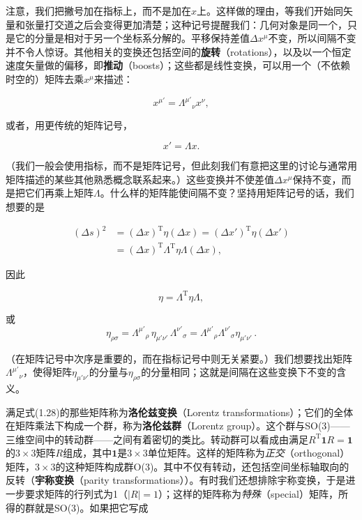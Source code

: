 注意，我们把撇号加在指标上，而不是加在$x$上。这样做的理由，等我们开始同矢量和张量打交道之后会变得更加清楚；这种记号提醒我们：几何对象是同一个，只是它的分量是相对于另一个坐标系分解的。平移保持差值$\Delta x^\mu$不变，所以间隔不变并不令人惊讶。其他相关的变换还包括空间的\textbf{旋转}（rotations），以及以一个恒定速度矢量做的偏移，即\textbf{推动}（boosts）；这些都是线性变换，可以用一个（不依赖时空的）矩阵去乘$x^\mu$来描述：

\begin{equation*}
x^{\mu'} = \Lambda^{\mu'}{}_{\nu}x^\nu,
\tag{1.25}
\end{equation*}

或者，用更传统的矩阵记号，

\begin{equation*}
x' = \Lambda x.
\tag{1.26}
\end{equation*}

（我们一般会使用指标，而不是矩阵记号，但此刻我们有意把这里的讨论与通常用矩阵描述的某些其他熟悉概念联系起来。）这些变换并不使差值$\Delta x^\mu$保持不变，而是把它们再乘上矩阵$\Lambda$。什么样的矩阵能使间隔不变？坚持用矩阵记号的话，我们想要的是

\begin{equation*}
\begin{aligned}
(\Delta s)^2 &= (\Delta x)^{\mathrm{T}}\eta(\Delta x) = (\Delta x')^{\mathrm{T}}\eta(\Delta x') \\
&= (\Delta x)^{\mathrm{T}}\Lambda^{\mathrm{T}}\eta\Lambda(\Delta x),
\end{aligned}
\tag{1.27}
\end{equation*}

因此

\begin{equation*}
\eta = \Lambda^{\mathrm{T}}\eta\Lambda,
\tag{1.28}
\end{equation*}

或
\begin{equation*}
\eta_{\rho\sigma}=\Lambda^{\mu'}{}_{\rho}\,\eta_{\mu'\nu'}\,\Lambda^{\nu'}{}_{\sigma}
=\Lambda^{\mu'}{}_{\rho}\Lambda^{\nu'}{}_{\sigma}\eta_{\mu'\nu'}\,.
\tag{1.29}
\end{equation*}

（在矩阵记号中次序是重要的，而在指标记号中则无关紧要。）我们想要找出矩阵$\Lambda^{\mu'}{}_{\nu}$，使得矩阵$\eta_{\mu'\nu'}$的分量与$\eta_{\rho\sigma}$的分量相同；这就是间隔在这些变换下不变的含义。

满足式(1.28)的那些矩阵称为\textbf{洛伦兹变换}（Lorentz transformations）；它们的全体在矩阵乘法下构成一个群，称为\textbf{洛伦兹群}（Lorentz group）。这个群与SO(3)——三维空间中的转动群——之间有着密切的类比。转动群可以看成由满足$R^{\mathrm{T}}\mathbf{1}R=\mathbf{1}$的$3\times3$矩阵$R$组成，其中$\mathbf{1}$是$3\times3$单位矩阵。这样的矩阵称为\emph{正交}（orthogonal）矩阵，$3\times3$的这种矩阵构成群O(3)。其中不仅有转动，还包括空间坐标轴取向的反转（\textbf{宇称变换}（parity transformations））。有时我们还想排除宇称变换，于是进一步要求矩阵的行列式为1（$|R|=1$）；这样的矩阵称为\emph{特殊}（special）矩阵，所得的群就是SO(3)。如果把它写成

